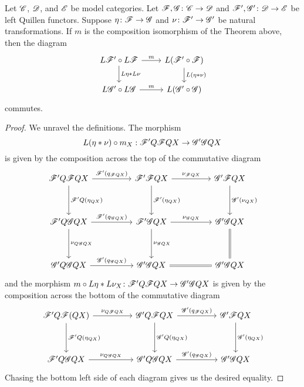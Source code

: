 \documentclass[10pt]{amsart}
\begin{document}
\begin{lem}
  Let $\mathscr{C}$, $\mathscr{D}$, and $\mathscr{E}$ be model categories.
  Let $\mathscr{F},\mathscr{G} \colon \mathscr{C} \to \mathscr{D}$ and $\mathscr{F}^\prime, \mathscr{G}^\prime \colon \mathscr{D} \to \mathscr{E}$ be left Quillen functors.
  Suppose $\eta \colon \mathscr{F} \to \mathscr{G}$ and $\nu \colon \mathscr{F}^\prime \to \mathscr{G}^\prime$ be natural transformations.
  If $m$ is the composition isomorphism of the Theorem above, then the diagram
  $$\begin{tikzcd}
    L\F^\prime \circ L\F \arrow{r}{m}\arrow{d}{L\eta \ast L\nu} & L(\F^\prime \circ \F)\arrow{d}{L(\eta \ast \nu)}\\
    L\G^\prime \circ L\G \arrow{r}{m} & L(\G^\prime \circ \G)
  \end{tikzcd}$$
  commutes.

  \begin{proof}
    We unravel the definitions.
    The morphism 
    $$L(\eta \ast \nu) \circ m_X : \mathscr{F}^\prime Q \mathscr{F} Q X \to \mathscr{G}^\prime \mathscr{G} Q X$$
    is given by the composition across the top of the commutative diagram
    $$\begin{tikzcd}
      \F^\prime Q \F Q X \arrow{rr}{\F^\prime(q_{\F Q X})}\arrow{dd}{\F^\prime Q(\eta_{QX})} && 
      \F^\prime \F QX \arrow{dd}{\F^\prime(\eta_{Q X})}\arrow{rr}{\nu_{\F Q X}} &&
      \G^\prime \F Q X \arrow{dd}{\G^\prime(\nu_{Q X})}
      \\
      \\
      \F^\prime Q \G Q X \arrow{rr}{\F^\prime(q_{\G Q X})}\arrow{dd}{\nu_{Q\G Q X}}&& 
      \F^\prime \G Q X \arrow{rr}{\nu_{\G Q X}}\arrow{dd}{\nu_{\G Q X}} && 
      \G^\prime\G QX \arrow[equals]{dd}\\
      \\
      \G^\prime Q \G Q X \arrow{rr}{\G^\prime(q_{\G Q X})} &&
      \G^\prime \G Q X \arrow[equals]{rr} &&
      \G^\prime \G Q X
    \end{tikzcd}$$
    and the morphism $m \circ L\eta \ast L\nu_X \colon \mathscr{F}^\prime Q \mathscr{F} Q X \to \mathscr{G}^\prime \mathscr{G} Q X$ is given by the composition across the bottom of the commutative diagram
    $$\begin{tikzcd}
      \F^\prime Q \F(QX) \arrow{dd}{\F^\prime Q(\eta_{QX})}\arrow{rr}{\nu_{Q\F Q X}} && 
      \G^\prime Q \F Q X \arrow{dd}{\G^\prime Q(\eta_{QX})}\arrow{rr}{\G^\prime(q_{\F Q X})}&&
      \G^\prime \F Q X \arrow{dd}{\G^\prime(\eta_{QX})}
      \\
      \\
      \F^\prime Q \G Q X \arrow{rr}{\nu_{Q\G Q X}}&& 
      \G^\prime Q \G QX \arrow{rr}{\G^\prime(q_{\G Q X})} &&
      \G^\prime \G Q X
    \end{tikzcd}$$
    Chasing the bottom left side of each diagram gives us the desired equality.
  \end{proof}
\end{lem}
\end{document}
